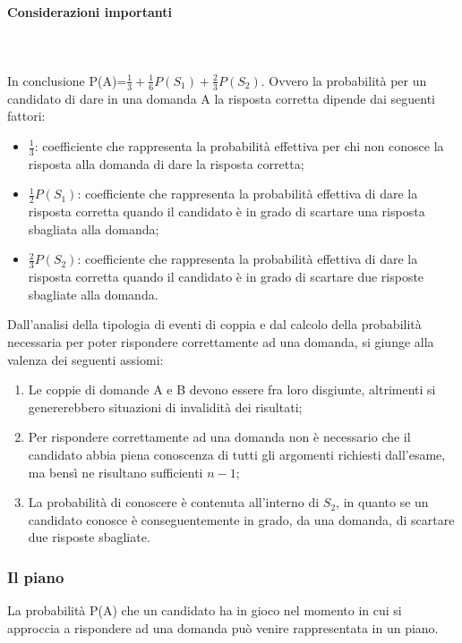  \paragraph{Considerazioni importanti} \mbox{}\\\\
 \label{Considerazioni importanti}
 \noindent
  In conclusione P(A)=$\frac{1}{3}+\frac{1}{6}P(S_1)+\frac{2}{3}P(S_2)$.
  Ovvero la probabilit\`a  per un candidato di dare in una domanda A la risposta corretta dipende dai seguenti fattori:
  \begin{itemize}
  \item $\frac{1}{3}$: coefficiente che rappresenta la probabilit\`a effettiva per chi non conosce la risposta alla domanda di dare la risposta corretta;
  \item $\frac{1}{2}P(S_1)$: coefficiente che rappresenta la probabilit\`a effettiva di  dare la risposta corretta quando il candidato \`e in grado di scartare una risposta sbagliata alla domanda;
   \item $\frac{2}{3}P(S_2)$: coefficiente che rappresenta la probabilit\`a effettiva di  dare la risposta corretta quando il candidato \`e in grado di scartare due risposte sbagliate alla domanda.
  \end{itemize}
  \noindent
  Dall'analisi della tipologia di eventi di coppia e dal calcolo della probabilit\`a necessaria per poter rispondere correttamente ad una domanda, si giunge alla valenza dei seguenti assiomi:
  \begin{enumerate}
  \item Le coppie di domande A e B devono essere fra loro disgiunte, altrimenti si genererebbero situazioni di invalidit\`a dei risultati;
  \item Per rispondere correttamente ad una domanda non \`e necessario che il candidato abbia piena conoscenza di tutti gli argomenti richiesti dall'esame, ma bens\`i ne risultano sufficienti $n-1$;
  \item La probabilit\`a di conoscere \`e contenuta all'interno di $S_{2}$, in quanto se un candidato conosce \`e conseguentemente in grado, da una domanda, di scartare due risposte sbagliate.
  \end{enumerate}
  
\subsubsection{Il piano}
\label{Il piano}
\noindent
La probabilit\`a P(A) che un candidato ha in gioco nel momento in cui si approccia a rispondere ad una domanda pu\`o venire rappresentata in un piano.\\\\

